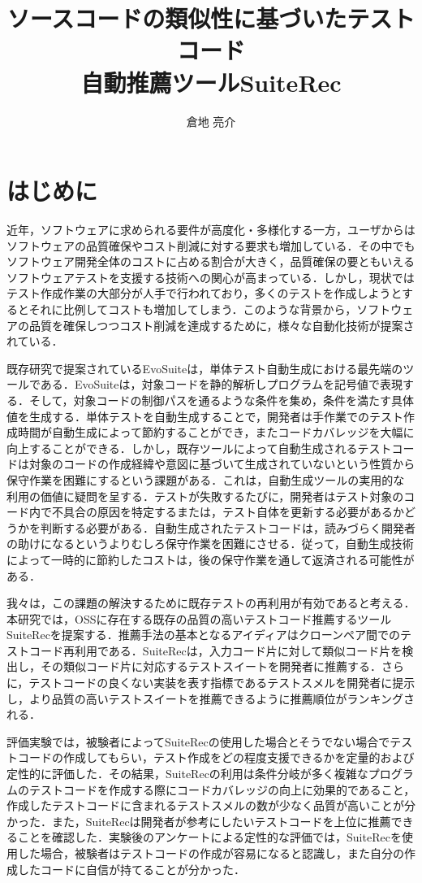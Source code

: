 \documentclass[12pt]{jarticle} %
\title{ソースコードの類似性に基づいたテストコード\\自動推薦ツールSuiteRec}
\author{倉地 亮介}
\begin{document}
%
%
\titlepage
\cmemberspage
\firstabstract
\secondabstract
%
%
\toc
\newpage
\listoffigures
\listoftables
%
%
\newpage
\section{はじめに}
近年，ソフトウェアに求められる要件が高度化・多様化する一方，ユーザからはソフトウェアの品質確保やコスト削減に対する要求も増加している\cite{tanno}．その中でもソフトウェア開発全体のコストに占める割合が大きく，品質確保の要ともいえるソフトウェアテストを支援する技術への関心が高まっている\cite{b20}．しかし，現状ではテスト作成作業の大部分が人手で行われており，多くのテストを作成しようとするとそれに比例してコストも増加してしまう．このような背景から，ソフトウェアの品質を確保しつつコスト削減を達成するために，様々な自動化技術が提案されている\cite{b19,EvoSuite,GRT,b17,T3}．

既存研究で提案されている{\sf EvoSuite}\cite{EvoSuite}は，単体テスト自動生成における最先端のツールである．{\sf EvoSuite}は，対象コードを静的解析しプログラムを記号値で表現する．そして，対象コードの制御パスを通るような条件を集め，条件を満たす具体値を生成する．単体テストを自動生成することで，開発者は手作業でのテスト作成時間が自動生成によって節約することができ，またコードカバレッジを大幅に向上することができる．しかし，既存ツールによって自動生成されるテストコードは対象のコードの作成経緯や意図に基づいて生成されていないという性質から保守作業を困難にするという課題がある\cite{b14,b15,b13}．これは，自動生成ツールの実用的な利用の価値に疑問を呈する．テストが失敗するたびに，開発者はテスト対象のコード内で不具合の原因を特定するまたは，テスト自体を更新する必要があるかどうかを判断する必要がある．自動生成されたテストコードは，読みづらく開発者の助けになるというよりむしろ保守作業を困難にさせる．従って，自動生成技術によって一時的に節約したコストは，後の保守作業を通して返済される可能性がある\cite{b1}．

我々は，この課題の解決するために既存テストの再利用が有効であると考える．本研究では，OSSに存在する既存の品質の高いテストコード推薦するツール{\sf SuiteRec}を提案する．推薦手法の基本となるアイディアはクローンペア間でのテストコード再利用である．{\sf SuiteRec}は，入力コード片に対して類似コード片を検出し，その類似コード片に対応するテストスイートを開発者に推薦する．さらに，テストコードの良くない実装を表す指標であるテストスメルを開発者に提示し，より品質の高いテストスイートを推薦できるように推薦順位がランキングされる．

評価実験では，被験者によって{\sf SuiteRec}の使用した場合とそうでない場合でテストコードの作成してもらい，テスト作成をどの程度支援できるかを定量的および定性的に評価した．その結果，{\sf SuiteRec}の利用は条件分岐が多く複雑なプログラムのテストコードを作成する際にコードカバレッジの向上に効果的であること，作成したテストコードに含まれるテストスメルの数が少なく品質が高いことが分かった．また，{\sf SuiteRec}は開発者が参考にしたいテストコードを上位に推薦できることを確認した．実験後のアンケートによる定性的な評価では，{\sf SuiteRec}を使用した場合，被験者はテストコードの作成が容易になると認識し，また自分の作成したコードに自信が持てることが分かった．
\end{document}
